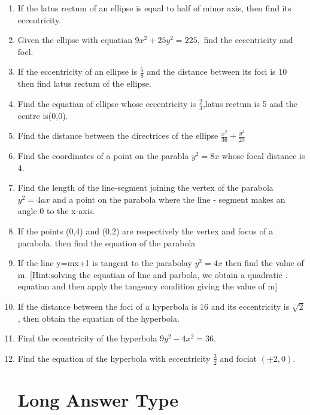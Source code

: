 \documentclass[12pt]{article}
\begin{document}
\begin{enumerate}
 [Hint:cancentric circles have the same [entre.]
 \item If the latus rectum of an ellipse is equal to half of minor axis, then find its eccentricity.
 \item Given the ellipse with equatian $9x^2+25y^2=225,$ find the eccentricity and focl.
 \item If the eccentricity of an ellipse is $\frac{5}{8}$ and  the distance between its foci is 10 then find latus rectum of the ellipse.
 \item Find the equatian of ellipse whose eccentricity is $\frac{2}{3}$,latus rectum is 5 and the centre is(0,0).
 \item Find the distance between the directrices of the ellipse $\frac{x^2}{36}+\frac{y^2}{20}$
 \item Find the coordinates of a point on the parabla $y^2=8x$ whose focal distance is 4.
 \item Find the length of the line-segment joining the vertex of the parabola $y^2=4ax$ and a point on the parabola where the line - segment makes an angle 0 to the x-axis.
\item If the points (0,4) and (0,2) are respectively the vertex and focus of a parabola. then find the equation of the parabola
\item If the line y=mx+1 is tangent to the parabolay $y^2=4x$ then find the value of m.
[Hint:solving the equatian of line  and parbola, we obtain a quadratic . equatian and then apply the tangency condition giving the value of m]
\item If the distance between the foci of a hyperbola is 16 and its eccentricity is $\sqrt{2}$, then obtain the equatian of the hyperbola.
\item Find the eccentricity of the hyperbola $9y^2-4x^2=36$.
\item Find the equation of the hyperbola with eccentricity $\frac{3}{2}$ and fociat $(\pm2,0)$.

\section*{Long Answer Type}


\end{enumerate}
\end{document}
